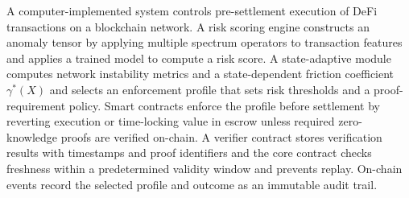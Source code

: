 \documentclass[12pt,a4paper]{article}
\begin{document}
A computer-implemented system controls pre-settlement execution of DeFi
transactions on a blockchain network. A risk scoring engine constructs an
anomaly tensor by applying multiple spectrum operators to transaction
features and applies a trained model to compute a risk score. A
state-adaptive module computes network instability metrics and a
state-dependent friction coefficient $\gamma^*(X)$ and selects an
enforcement profile that sets risk thresholds and a proof-requirement
policy. Smart contracts enforce the profile before settlement by reverting
execution or time-locking value in escrow unless required zero-knowledge
proofs are verified on-chain. A verifier contract stores verification
results with timestamps and proof identifiers and the core contract checks
freshness within a predetermined validity window and prevents replay.
On-chain events record the selected profile and
outcome as an immutable audit trail.
\end{document}
